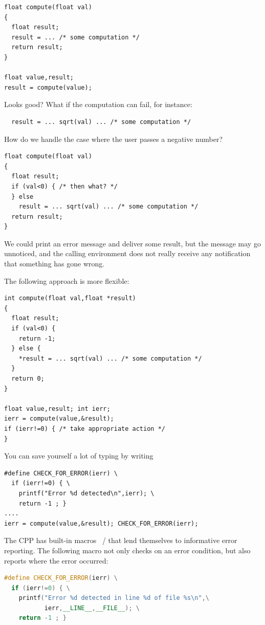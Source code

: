 \begin{lstlisting}
float compute(float val)
{
  float result;
  result = ... /* some computation */
  return result;
}

float value,result;
result = compute(value);
\end{lstlisting}
Looks good? What if the computation can fail, for instance:
\begin{lstlisting}
  result = ... sqrt(val) ... /* some computation */
\end{lstlisting}
How do we handle the case where the user passes a negative number?
\begin{lstlisting}
float compute(float val)
{
  float result;
  if (val<0) { /* then what? */ 
  } else 
    result = ... sqrt(val) ... /* some computation */
  return result;
}
\end{lstlisting}
We could print an error message and deliver some result, but the
message may go unnoticed, and the calling environment does not really
receive any notification that something has gone wrong.

The following approach is more flexible:
\begin{lstlisting}
int compute(float val,float *result)
{
  float result;
  if (val<0) {
    return -1;
  } else {
    *result = ... sqrt(val) ... /* some computation */
  }
  return 0;
}

float value,result; int ierr;
ierr = compute(value,&result);
if (ierr!=0) { /* take appropriate action */
}
\end{lstlisting}
You can save yourself a lot of typing by writing
\begin{lstlisting}
#define CHECK_FOR_ERROR(ierr) \
  if (ierr!=0) { \
    printf("Error %d detected\n",ierr); \
    return -1 ; }
....
ierr = compute(value,&result); CHECK_FOR_ERROR(ierr);
\end{lstlisting}


The \ac{CPP} has built-in macros
~/ 
that lend themselves
to informative error reporting.
The following macro not only checks on an error condition,
but also reports where the error occurred:
\begin{lstlisting}[language=cpp]
#define CHECK_FOR_ERROR(ierr) \
  if (ierr!=0) { \
    printf("Error %d detected in line %d of file %s\n",\
           ierr,__LINE__,__FILE__); \
    return -1 ; }
\end{lstlisting}


